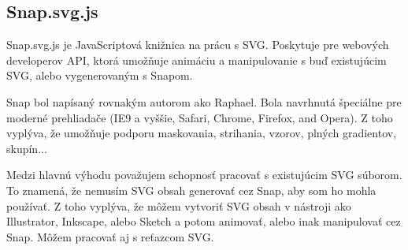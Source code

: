 


\subsection{Snap.svg.js}

Snap.svg.js je JavaScriptová knižnica na prácu s SVG. Poskytuje pre webových developerov \acs{API}, ktorá umožňuje animáciu a manipulovanie s buď existujúcim SVG, alebo vygenerovaným s Snapom. 

Snap bol napísaný rovnakým autorom ako Raphael.  Bola navrhnutá špeciálne pre moderné prehliadače (IE9 a vyššie, Safari, Chrome, Firefox, and Opera). Z toho vyplýva, že umožňuje podporu maskovania, strihania, vzorov, plných gradientov, skupín... 



Medzi hlavnú výhodu považujem schopnosť pracovať s existujúcim SVG súborom. To znamená, že nemusím SVG obsah generovať cez Snap, aby som ho mohla používať. Z toho vyplýva, že môžem vytvoriť SVG obsah v nástroji ako Illustrator, Inkscape, alebo Sketch a potom animovať, alebo inak manipulovať cez Snap. Môžem pracovať aj s reťazcom SVG.


